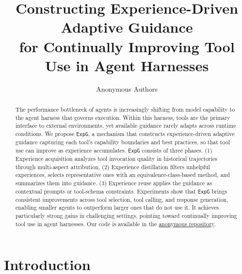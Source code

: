 \documentclass[11pt]{article}
\title{Constructing Experience-Driven Adaptive Guidance \\ for Continually Improving Tool Use in Agent Harnesses}
\author{Anonymous Authors}
\newcommand{\ours}{\texttt{ExpG}}
\begin{document}
\maketitle


\begin{abstract}
The performance bottleneck of agents is increasingly shifting from model capability to the agent harness that governs execution. 
Within this harness, tools are the primary interface to external environments, yet available guidance rarely adapts across runtime conditions. 
We propose {\ours}, a mechanism that constructs experience-driven adaptive guidance capturing each tool's capability boundaries and best practices, so that tool use can improve as experience accumulates. 
{\ours} consists of three phases. 
(1) Experience acquisition analyzes tool invocation quality in historical trajectories through multi-aspect attribution. 
(2) Experience distillation filters unhelpful experiences, selects representative ones with an equivalence-class-based method, and summarizes them into guidance. 
(3) Experience reuse applies the guidance as contextual prompts or tool-schema constraints. 
Experiments show that {\ours} brings consistent improvements across tool selection, tool calling, and response generation, enabling smaller agents to outperform larger ones that do not use it. It achieves particularly strong gains in challenging settings, pointing toward continually improving tool use in agent harnesses. Our code is available in the \href{https://anonymous.4open.science/r/ExpG-F72B/README.md}{anonymous repository}.
\end{abstract}



\section{Introduction}


\end{document}
